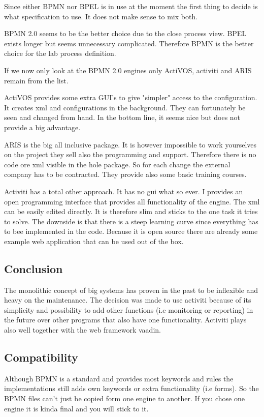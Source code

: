 \documentclass[paper=a4,twoside=false,BCOR=0mm,DIV=calc,fontsize=12pt]{scrartcl}
\begin{document}
Since either BPMN nor BPEL is in use at the moment the first thing to decide is what specification to use.
It does not make sense to mix both. 

BPMN 2.0 seems to be the better choice due to the close process view. BPEL exists longer but seems unnecessary complicated.
Therefore BPMN is the better choice for the lab process definition. 

If we now only look at the BPMN 2.0 engines only ActiVOS, activiti and ARIS remain from the list.

ActiVOS provides some extra GUI's to give "simpler" access to the configuration. It creates xml and configurations in the background.
They can fortunately be seen and changed from hand. In the bottom line, it seems nice but does not provide a big advantage. 

ARIS is the big all inclusive package. It is however impossible to work yourselves on the project they sell also the programming and support. Therefore there is no code ore xml visible in the hole package. So for each change the external company has to be contracted.
They provide also some basic training courses.

Activiti has a total other approach. It has no gui what so ever. I provides an open programming interface that provides all functionality 
of the engine. The xml can be easily edited directly. It is therefore slim and sticks to the one task it tries to solve.
The downside is that there is a steep learning curve since everything has to bee implemented in the code. 
Because it is open source there are already some example web application that can be used out of the box. 

\subsection{Conclusion}
The monolithic concept of big systems has proven in the past to be inflexible and heavy on the maintenance. 
The decision was made to use activiti because of its simplicity and possibility to add other functions (i.e monitoring or reporting) in the future over other programs that also have one functionality.
Activiti plays also well together with the web framework vaadin.


\subsection{Compatibility}
Although BPMN is a standard and provides most keywords and rules the implementations still adds own keywords or extra functionality (i.e
forms). So the BPMN files can't just be copied form one engine to another. If you chose one engine it is kinda final and you will stick to it.
\end{document}
